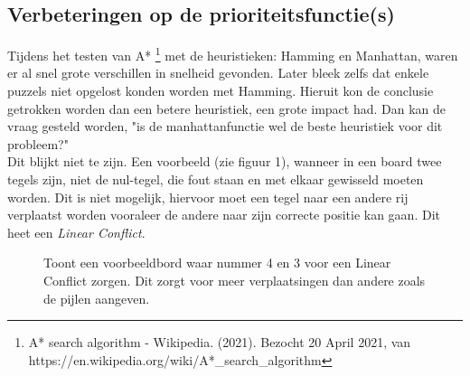 \documentclass[a4paper]{article}
\numberwithin{equation}{section}
\begin{document}
    \pagebreak

        \subsection{Verbeteringen op de prioriteitsfunctie(s)}
        Tijdens het testen van A* \footnote{A* search algorithm - Wikipedia. (2021). Bezocht 20 April 2021, van https://en.wikipedia.org/wiki/A*\_search\_algorithm}
        met de heuristieken: Hamming en Manhattan, waren er al snel grote verschillen in snelheid gevonden. Later bleek zelfs dat enkele puzzels niet opgelost konden worden met Hamming. 
        Hieruit kon de conclusie getrokken worden dan een betere heuristiek, een grote impact had. Dan kan de vraag gesteld worden, "is de manhattanfunctie wel de beste heuristiek voor dit probleem?"
        \\Dit blijkt niet te zijn. Een voorbeeld (zie figuur 1), wanneer in een board twee tegels zijn, niet de nul-tegel, die fout staan en met elkaar gewisseld moeten worden. Dit is
        niet mogelijk, hiervoor moet een tegel naar een andere rij verplaatst worden vooraleer de andere naar zijn correcte positie kan gaan. Dit heet een \textit{Linear Conflict}.
       
        \begin{figure}[ht]

            \center

            \caption[Voorbeeld van Linear Conflict]{Toont een voorbeeldbord waar nummer 4 en 3 voor een Linear Conflict zorgen. Dit zorgt voor meer verplaatsingen dan andere zoals de pijlen aangeven.}
            \label{fig:Linear Conflicts}
        \end{figure}
\end{document}
